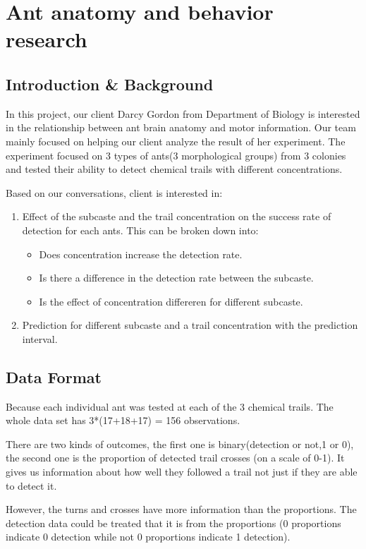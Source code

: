 \documentclass{article}
\begin{document}
	\section{Ant anatomy and behavior research}
	\subsection{Introduction \& Background}
	In this project, our client Darcy Gordon from Department of Biology is interested in the relationship between ant brain anatomy and motor information. Our team mainly focused on helping our client analyze the result of her experiment. The experiment focused on 3 types of ants(3 morphological groups) from 3 colonies and tested their ability to detect chemical trails with different concentrations. 

	Based on our conversations, client is interested in:
	\begin{enumerate}
		\item Effect of the subcaste and the trail concentration on the success rate of detection for each ants. This can be broken down into:
		\begin{itemize}
			\item Does concentration increase the detection rate.
			\item Is there a difference in the detection rate between the subcaste.
			\item Is the effect of concentration differeren for different subcaste.
		\end{itemize}
		\item Prediction for different subcaste and a trail concentration with the prediction interval.
	\end{enumerate}
	
	\subsection{Data Format}
	Because each individual ant was tested at each of the 3 chemical trails. The whole data set has 3*(17+18+17) = 156 observations. 
	
	There are two kinds of outcomes, the first one is binary(detection or not,1 or 0), the second one is the proportion of detected trail crosses (on a scale of 0-1). It gives us information about how well they followed a trail not just if they are able to detect it. 
	
	However, the turns and crosses have more information than the proportions. The detection data could be treated that it is from the proportions (0 proportions indicate 0 detection while not 0 proportions indicate 1 detection).
	
\end{document}
